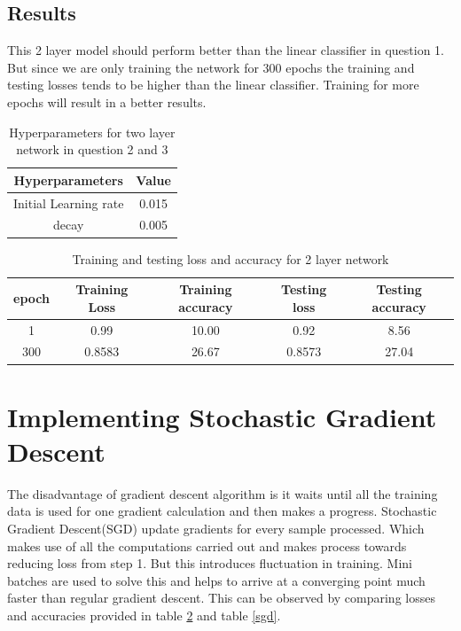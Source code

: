 \documentclass[a4paper, 12pt]{article}
\begin{document}
		\subsection{Results}
		This 2 layer model should perform better than the linear classifier in question 1. But since we are only training the network for 300 epochs the training and testing losses tends to be higher than the linear classifier. Training for more epochs will result in a better results.
		\begin{table}
			\centering
			\begin{tabular}{|c|c|}
				\hline
				Hyperparameters & Value \\
				\hline
				Initial Learning rate & 0.015 \\
				decay	& 0.005 \\
				\hline
			\end{tabular}
			\label{param2}
			\caption{Hyperparameters for two layer network in question 2 and 3}
		\end{table}
		\begin{table}
			\centering
			\begin{tabular}{|c|c|c|c|c|}
				\hline
				epoch & Training Loss & Training accuracy & Testing loss & Testing accuracy\\
				\hline
				1 & 0.99 & 10.00 & 0.92 & 8.56 \\
				300 & 0.8583 & 26.67 & 0.8573 & 27.04\\
				\hline
			\end{tabular}
			\caption{Training and testing loss and accuracy for 2 layer network}
			\label{nn2}
		\end{table}
	\section{Implementing Stochastic Gradient Descent}
		The disadvantage of gradient descent algorithm is it waits until all the training data is used for one gradient calculation and then makes a progress. Stochastic Gradient Descent(SGD) update gradients for every sample processed. Which makes use of all the computations carried out and makes process towards reducing loss from step 1. But this introduces fluctuation in training. Mini batches are used to solve this and helps to arrive at a converging point much faster than regular gradient descent. This can be observed by comparing losses and accuracies provided in table \ref{nn2} and table \ref{sgd}. 
\end{document}
